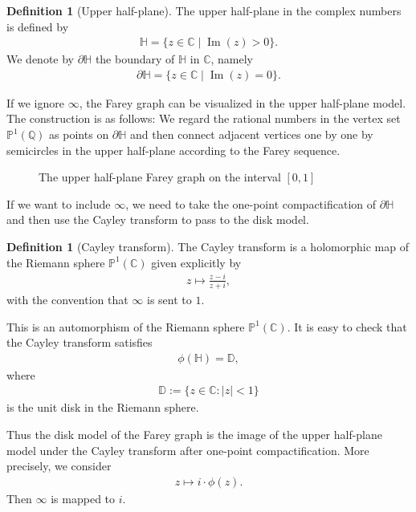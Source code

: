 \documentclass[10pt, a4paper]{article}
\renewcommand{\P}{\mathbb{P}}
\newcommand{\C}{\mathbb{C}}
\newcommand{\Q}{\mathbb{Q}}
\newcommand{\D}{\mathbb{D}}
\newcommand{\HH}{\mathbb{H}} %
\renewcommand{\Im}{\operatorname{Im}}
\theoremstyle{definition}
\newtheorem{definition}[theorem]{Definition}
\theoremstyle{remark}
\begin{document}
\begin{definition}[Upper half-plane]
    The upper half-plane in the complex numbers is defined by
    \begin{align*}
        \HH = \{z\in\C\mid \Im(z)>0\}.
    \end{align*}
    We denote by \(\partial \HH\) the boundary of \(\HH\) in \(\C\), namely
    \begin{align*}
        \partial \HH = \{z\in\C\mid \Im(z)=0\}.
    \end{align*}
\end{definition}

If we ignore \(\infty\), the Farey graph can be visualized in the upper half-plane model. The construction is as follows: We regard the rational numbers in the vertex set \(\P^1(\Q)\) as points on \(\partial\HH\) and then connect adjacent vertices one by one by semicircles in the upper half-plane according to the Farey sequence.

\begin{figure}[H]
    \centering
    \caption{The upper half-plane Farey graph on the interval \([0,1]\)}
    \label{fig:farey_uhp}
\end{figure}

If we want to include \(\infty\), we need to take the one-point compactification of \(\partial\HH\) and then use the Cayley transform to pass to the disk model.

\begin{definition}[Cayley transform]
    The Cayley transform is a holomorphic map of the Riemann sphere \(\P^1(\C)\) given explicitly by
    \begin{align*}
        z \mapsto  \frac{z-i}{z+i},
    \end{align*}
    with the convention that \(\infty\) is sent to \(1\).
\end{definition}

This is an automorphism of the Riemann sphere \(\P^1(\C)\). It is easy to check that the Cayley transform satisfies
\begin{align*}
    \phi(\HH) = \D,
\end{align*}
where
\begin{align*}
    \D:= \{z\in\C: |z|<1\}
\end{align*}
is the unit disk in the Riemann sphere.

Thus the disk model of the Farey graph is the image of the upper half-plane model under the Cayley transform after one-point compactification. More precisely, we consider
\begin{align*}
    z\mapsto i\cdot\phi(z).
\end{align*}
Then \(\infty\) is mapped to \(i\).
\end{document}

